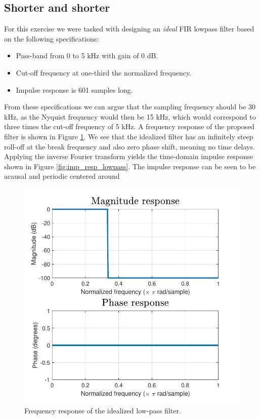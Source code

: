 \documentclass[journal]{IEEEtran}
\begin{document}
\subsection{Shorter and shorter}
For this exercise we were tasked with designing an \textit{ideal} FIR lowpass filter based on the following specifications: 
\begin{itemize}
    \item Pass-band from 0 to 5 kHz with gain of 0 dB. 
    \item Cut-off frequency at one-third the normalized frequency. 
    \item Impulse response is 601 samples long. 
\end{itemize}
From these specifications we can argue that the sampling frequency should be 30 kHz, as the Nyquist frequency would then be 15 kHz, which would correspond to three times the cut-off frequency of 5 kHz. A frequency response of the proposed filter is shown in Figure \ref{fig:freq_resp_lowpass}. We see that the idealized filter has an infinitely steep roll-off at the break frequency and also zero phase shift, meaning no time delays. Applying the inverse Fourier transform yields the time-domain impulse response shown in Figure \ref{fig:imp_resp_lowpass}. The impulse response can be seen to be acausal and periodic centered around 

\begin{figure}
    \centering
    \includegraphics[width=\columnwidth,clip]{assignment_02/plots/freq_resp_lowpass_fir.pdf}
    \caption{Frequency response of the idealized low-pass filter.}
    \label{fig:freq_resp_lowpass}
\end{figure}
\end{document}
